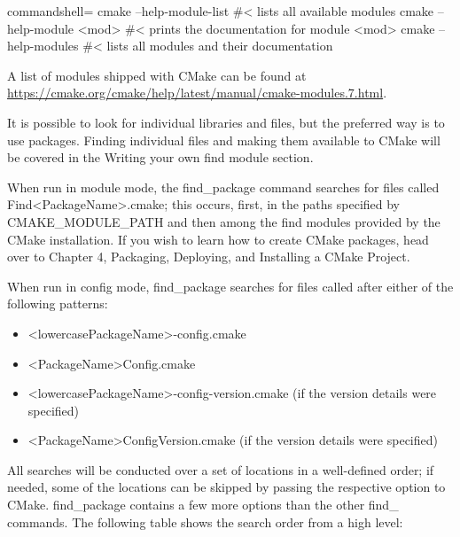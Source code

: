 \begin{tcblisting}{commandshell={}}
cmake --help-module-list #< lists all available modules
cmake --help-module <mod> #< prints the documentation for
  module
  <mod>
cmake --help-modules #< lists all modules and their
  documentation
\end{tcblisting}

A list of modules shipped with CMake can be found at \url{https://cmake.org/cmake/help/latest/manual/cmake-modules.7.html}.

\begin{tcolorbox}[colback=blue!5!white,colframe=blue!75!black,title=查找单个库和文件]
It is possible to look for individual libraries and files, but the preferred way is to use packages. Finding individual files and making them available to CMake will be covered in the Writing your own find module section.
\end{tcolorbox}

When run in module mode, the find\_package command searches for files called Find<PackageName>.cmake; this occurs, first, in the paths specified by CMAKE\_MODULE\_PATH and then among the find modules provided by the CMake installation. If you wish to learn how to create CMake packages, head over to Chapter 4, Packaging, Deploying, and Installing a CMake Project.

When run in config mode, find\_package searches for files called after either of the following patterns:

\begin{itemize}
\item 
<lowercasePackageName>-config.cmake

\item 
<PackageName>Config.cmake

\item 
<lowercasePackageName>-config-version.cmake (if the version details were specified)

\item 
<PackageName>ConfigVersion.cmake (if the version details were specified)
\end{itemize}

All searches will be conducted over a set of locations in a well-defined order; if needed, some of the locations can be skipped by passing the respective option to CMake. find\_package contains a few more options than the other find\_ commands. The following table shows the search order from a high level:

